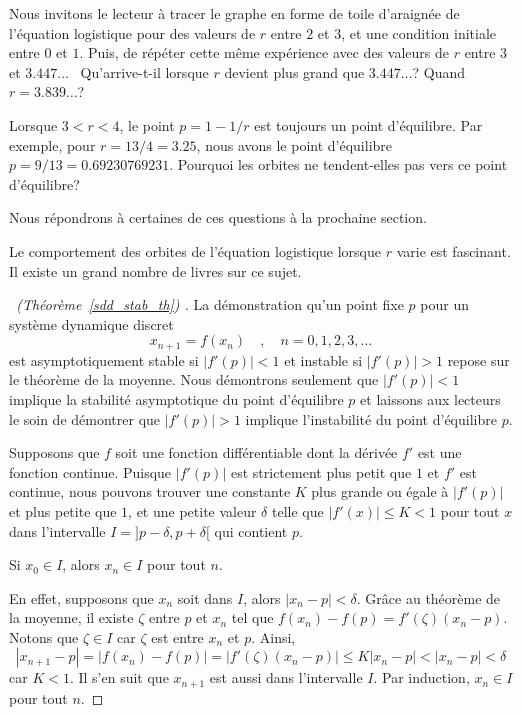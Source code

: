 {\begin{rmk}
Nous invitons le lecteur à tracer le graphe en forme de toile
d'araignée de l'équation logistique pour des valeurs de $r$ entre $2$
et $3$, et une condition initiale entre $0$ et $1$.  Puis, de répéter
cette même expérience avec des valeurs de $r$ entre $3$ et $3.447\ldots$
\ Qu'arrive-t-il lorsque $r$ devient plus grand que $3.447\ldots$?
Quand $r = 3.839\ldots$?

Lorsque $3<r<4$, le point $p=1-1/r$ est toujours un point
d'équilibre.  Par exemple, pour $r=13/4=3.25$, nous avons le point
d'équilibre $p=9/13=0.69230769231$.  Pourquoi les orbites ne
tendent-elles pas vers ce point d'équilibre?

Nous répondrons à certaines de ces questions à la prochaine section.

Le comportement des orbites de l'équation logistique lorsque $r$ varie
est fascinant.   Il existe un grand nombre de livres sur ce sujet.
\end{rmk}

\begin{proof}[\UOproof\ (Théorème~\ref{sdd_stab_th}) \theory]
La démonstration qu'un point fixe $p$ pour un système dynamique discret
\[
x_{n+1} = f(x_n) \quad , \quad n=0, 1, 2, 3, \ldots
\]
est asymptotiquement stable si $|f'(p)|<1$ et instable si $|f'(p)|>1$
repose sur le théorème de la moyenne.  Nous démontrons seulement que
$|f'(p)|<1$ implique la stabilité asymptotique du point d'équilibre
$p$ et laissons aux lecteurs le soin de démontrer que $|f'(p)|>1$
implique l'instabilité du point d'équilibre $p$.

Supposons que $f$ soit une fonction différentiable dont la dérivée
$f'$ est une fonction continue.  Puisque $|f'(p)|$ est strictement
plus petit que $1$ et $f'$ est continue, nous pouvons trouver une constante
$K$ plus grande ou égale à $|f'(p)|$ et plus petite que $1$, et une
petite valeur $\delta$ telle que $|f'(x)| \leq K<1$ pour tout $x$ dans
l'intervalle $I = ]p-\delta, p+\delta[$ qui contient $p$.

 Si $x_0 \in I$, alors $x_n \in I$ pour tout $n$.

En effet, supposons que $x_n$ soit dans $I$, alors $|x_n-p|<\delta$.  Grâce
au théorème de la moyenne, il existe $\zeta$ entre $p$ et $x_n$ tel que
$f(x_n) - f(p) = f'(\zeta)(x_n - p)$.  Notons que $\zeta \in I$ car $\zeta$
est entre $x_n$ et $p$.  Ainsi,
\[
|x_{n+1} - p| = |f(x_n) - f(p)| = |f'(\zeta)(x_n - p)|
\leq K | x_n - p | < |x_n - p| < \delta
\]
car $K<1$.  Il s'en suit que $x_{n+1}$ est aussi dans l'intervalle $I$.
Par induction, $x_n \in I$ pour tout $n$.


\end{proof}}
